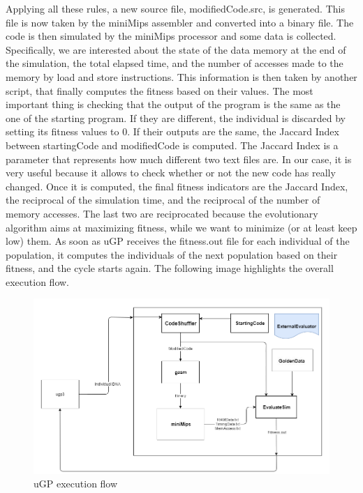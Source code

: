 \documentclass[a4paper,twoside]{article}
\theoremstyle{definition}
\theoremstyle{remark}
\begin{document}
Applying all these rules, a new source file, modifiedCode.src, is generated. This file is now taken by the miniMips assembler and converted into a binary file. \newline
The code is then simulated by the miniMips processor and some data is collected. Specifically, we are interested about the state of the data memory at the end of the simulation, the total elapsed time, and the number of accesses made to the memory by load and store instructions.\newline
This information is then taken by another script, that finally computes the fitness based on their values. The most important thing is checking that the output of the program is the same as the one of the starting program. If they are different, the individual is discarded by setting its fitness values to 0. If their outputs are the same, the Jaccard Index between startingCode and modifiedCode is computed. The Jaccard Index is a parameter that represents how much different two text files are. In our case, it is very useful because it allows to check whether or not the new code has really changed. \newline
Once it is computed, the final fitness indicators are the Jaccard Index, the reciprocal of the simulation time, and the reciprocal of the number of memory accesses. The last two are reciprocated because the evolutionary algorithm aims at maximizing fitness, while we want to minimize (or at least keep low) them. \newline
As soon as uGP receives the fitness.out file for each individual of the population, it computes the individuals of the next population based on their fitness, and the cycle starts again.
\newline
The following image highlights the overall execution flow.
\newline
\newline
\newline
\newline
\newline

\begin{figure}[H]
\raggedright
\includegraphics[scale=0.5]{Immagini/01}
\caption{uGP execution flow}
\end{figure}
\end{document}
